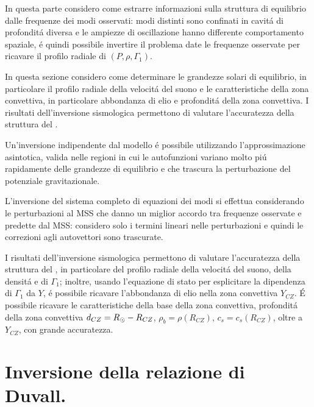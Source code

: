 \documentclass[../main.tex]{subfiles}
\begin{document}
\begin{errata}
In questa parte considero come estrarre informazioni sulla struttura di equilibrio dalle frequenze dei modi osservati: modi distinti sono confinati in cavit\'a di profondit\'a diversa e le ampiezze di oscillazione hanno differente comportamento spaziale, \'e quindi possibile invertire il problema date le frequenze osservate per ricavare il profilo radiale di $(P,\rho,\Gamma_1)$.
\end{errata}

In questa sezione considero come determinare le grandezze solari di equilibrio, in particolare il profilo radiale della velocit\'a del suono e le caratteristiche della zona convettiva, in particolare abbondanza di elio e profondit\'a della zona convettiva. I risultati dell'inversione sismologica permettono di valutare l'accuratezza della struttura del \mss{}.

Un'inversione indipendente dal modello \'e possibile utilizzando l'approssimazione asintotica, valida nelle regioni in cui le autofunzioni variano molto pi\'u rapidamente delle grandezze di equilibrio e che trascura la perturbazione del potenziale gravitazionale.
 
L'inversione del sistema completo di equazioni dei modi si effettua considerando le perturbazioni al MSS che danno un miglior accordo tra frequenze osservate e predette dal MSS: considero solo i termini lineari nelle perturbazioni e quindi le correzioni agli autovettori sono trascurate.

\begin{errata}
I risultati dell'inversione sismologica permettono di valutare l'accuratezza della struttura del \mss{}, in particolare del profilo radiale della velocit\'a del suono, della densit\'a e di $\Gamma_1$; inoltre, usando l'equazione di stato per esplicitare la dipendenza di $\Gamma_1$ da $Y$, \'e possibile ricavare l'abbondanza di elio nella zona convettiva $Y_{CZ}$.
\'E possibile ricavare le caratteristiche della base della zona convettiva, profondit\'a della zona convettiva $d_{CZ}=R_{\odot}{}-R_{CZ}$, $\rho_b=\rho(R_{CZ})$, $c_s=c_s(R_{CZ})$, oltre a $Y_{CZ}$, con grande accuratezza.
\end{errata}

{\let\clearpage\relax\let\cleardoublepage\relax \chapter{Inversione della relazione di Duvall.}} %
\end{document}
